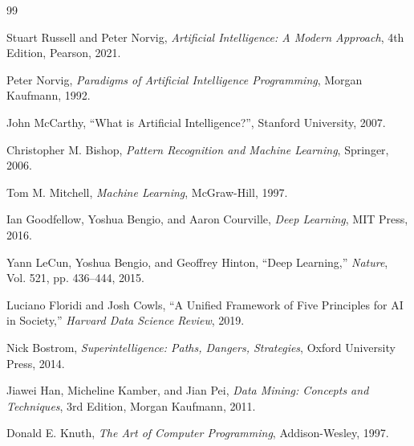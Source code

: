 \documentclass[12pt]{article}
\begin{document}
\begin{thebibliography}{99}

Stuart Russell and Peter Norvig,
\textit{Artificial Intelligence: A Modern Approach},
4th Edition, Pearson, 2021.

Peter Norvig,
\textit{Paradigms of Artificial Intelligence Programming},
Morgan Kaufmann, 1992.

John McCarthy,
``What is Artificial Intelligence?'',
Stanford University, 2007.

Christopher M. Bishop,
\textit{Pattern Recognition and Machine Learning},
Springer, 2006.

Tom M. Mitchell,
\textit{Machine Learning},
McGraw-Hill, 1997.

Ian Goodfellow, Yoshua Bengio, and Aaron Courville,
\textit{Deep Learning},
MIT Press, 2016.

Yann LeCun, Yoshua Bengio, and Geoffrey Hinton,
``Deep Learning,''
\textit{Nature}, Vol. 521, pp. 436--444, 2015.

Luciano Floridi and Josh Cowls,
``A Unified Framework of Five Principles for AI in Society,''
\textit{Harvard Data Science Review}, 2019.

Nick Bostrom,
\textit{Superintelligence: Paths, Dangers, Strategies},
Oxford University Press, 2014.

Jiawei Han, Micheline Kamber, and Jian Pei,
\textit{Data Mining: Concepts and Techniques},
3rd Edition, Morgan Kaufmann, 2011.

Donald E. Knuth,
\textit{The Art of Computer Programming},
Addison-Wesley, 1997.

\end{thebibliography}
\end{document}
